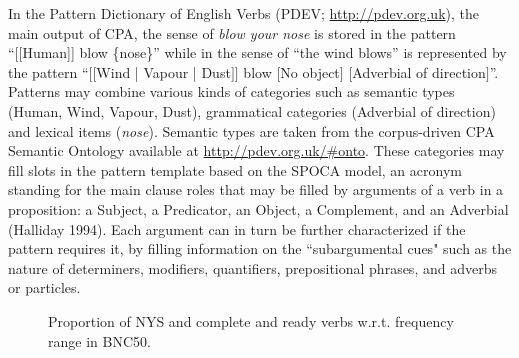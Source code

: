 \documentclass[output=paper]{langsci/langscibook}
\begin{document}
In the  Pattern Dictionary of English Verbs (PDEV;
\url{http://pdev.org.uk}), the main output of CPA, the sense of  \textit{blow
  your nose} is stored in the pattern “[[Human]] blow \{nose\}” while in
the sense of “the wind blows” is represented by the pattern “$[$$[$Wind |
Vapour | Dust$]$$]$ blow $[$No object$]$ $[$Adverbial of direction$]$”. Patterns 
may combine various kinds of categories such as semantic types (Human,
Wind, Vapour, Dust), grammatical categories (Adverbial of direction)
and lexical items (\textit{nose}). Semantic types are taken from the
corpus-driven CPA Semantic Ontology available at
\url{http://pdev.org.uk/#onto}. These categories may fill slots in the
pattern template based on the SPOCA model, an acronym standing for the
main clause roles that may be filled by arguments of a verb in a
proposition: a Subject, a Predicator, an Object, a Complement, and an
Adverbial (Halliday 1994). Each argument can in turn be further
characterized if the pattern requires it, by filling information on the
``subargumental cues" such as the nature of determiners, modifiers,
quantifiers, prepositional phrases, and adverbs or particles.

\begin{figure}
\caption{Proportion of NYS and complete and ready verbs w.r.t. frequency range in BNC50.}
\label{fig:04:01}
\end{figure}
\end{document}
